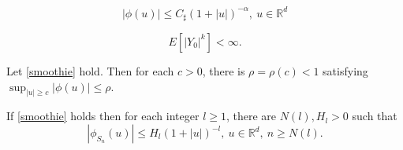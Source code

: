 \documentclass[10pt,a4paper]{amsart}
\begin{document}
\begin{equation}\label{smoothie}
|\phi(u)|\leq C_{\sharp}(1+|u|)^{-\alpha},\ u\in\mathbb{R}^{d}
\end{equation}

\begin{equation}\label{momenti}
E[|Y_{0}|^{k}]<\infty.	
\end{equation}

\begin{lemma}\label{sublemma} Let \eqref{smoothie} hold. Then for each $c>0$,
there is $\rho=\rho(c)<1$ satisfying $\sup_{|u|\geq c}|\phi(u)|\leq \rho$.	
\end{lemma}

\begin{lemma}\label{bundi} If \eqref{smoothie} holds then
for each integer $l\geq 1$, there are $N(l),H_{l}>0$ such that
\begin{equation}\label{valami}
|\phi_{S_{n}}(u)|\leq H_{l}(1+|u|)^{-l},\ u\in\mathbb{R}^{d},\ n\geq N(l).
\end{equation}
\end{lemma}
\end{document}
